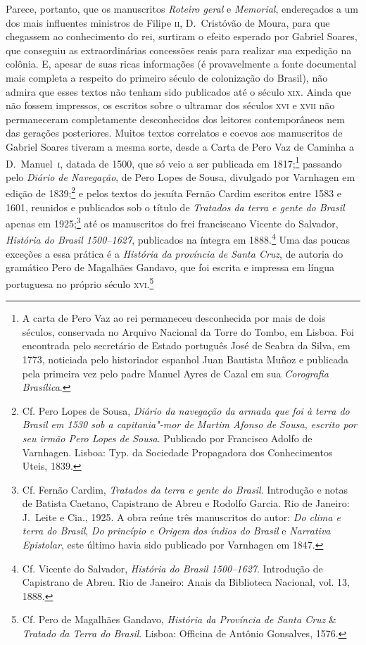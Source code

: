 \documentclass[12pt]{extarticle}
\begin{document}
{Parece, portanto, que os manuscritos \textit{Roteiro geral} e
\textit{Memorial}, endereçados a um dos mais influentes ministros de
Filipe 	\textsc{ii}, D.~Cristóvão de Moura, para que chegassem ao conhecimento do
rei, surtiram o efeito esperado por Gabriel Soares, que conseguiu as
extraordinárias concessões reais para realizar sua expedição na
colônia. E, apesar de suas ricas informações (é provavelmente a fonte
documental mais completa a respeito do primeiro século de colonização
do Brasil), não admira que esses textos não tenham sido publicados até
o século \textsc{xix}. Ainda que não fossem impressos, os escritos sobre o
ultramar dos séculos \textsc{xvi} e \textsc{xvii} não permaneceram completamente
desconhecidos dos leitores contemporâneos nem das gerações posteriores.
Muitos textos correlatos e coevos aos manuscritos de Gabriel Soares
tiveram a mesma sorte, desde a Carta de Pero Vaz de Caminha a D.~Manuel~\textsc{i}, 
datada de 1500, que só veio a ser publicada em 1817;\footnote{ A
carta de Pero Vaz ao rei permaneceu desconhecida por mais de dois
séculos, conservada no Arquivo Nacional da Torre do Tombo, em Lisboa.
Foi encontrada pelo secretário de Estado português José de Seabra da
Silva, em 1773, noticiada pelo historiador espanhol Juan Bautista Muñoz
e publicada pela primeira vez pelo padre Manuel Ayres de Cazal em sua
\textit{Corografia Brasílica}.} passando pelo
\textit{Diário de Navegação}, de Pero Lopes de Sousa, divulgado por
Varnhagen em edição de 1839;\footnote{ Cf. Pero Lopes de Sousa, \textit{Diário da navegação da armada que 
foi à terra do Brasil em 1530 sob a capitania"-mor de Martim Afonso de Sousa,
escrito por seu irmão Pero Lopes de Sousa}. Publicado por Francisco Adolfo de Varnhagen. 
Lisboa: Typ. da Sociedade Propagadora dos Conhecimentos Uteis, 1839.} e pelos textos do jesuíta Fernão Cardim
escritos entre 1583 e 1601, reunidos e publicados 
sob o título de \textit{Tratados da terra e gente do Brasil} apenas em
1925;\footnote{ Cf. Fernão Cardim, \textit{Tratados da terra e gente do Brasil}. 
Introdução e notas de Batista Caetano, Capistrano de Abreu e Rodolfo Garcia. 
Rio de Janeiro: J.~Leite e Cia., 1925. 
A obra reúne três manuscritos do autor: \textit{Do clima e terra do Brasil}, \textit{Do princípio e Origem dos índios do Brasil}
e \textit{Narrativa Epistolar}, este último havia sido publicado por Varnhagen em 1847.} até os manuscritos do frei franciscano Vicente do Salvador,
\textit{História do Brasil 1500--1627}, publicados na íntegra em 1888.\footnote{ Cf. Vicente do Salvador, \textit{História do Brasil 1500--1627}.
Introdução de Capistrano de Abreu. Rio de Janeiro: Anais da Biblioteca Nacional, vol. 13, 1888.}
Uma das poucas exceções a essa prática é a \textit{História da
província de Santa Cruz}, de autoria do gramático Pero de
Magalhães Gandavo, que foi escrita e impressa em língua portuguesa no
próprio século \textsc{xvi}.\footnote{ Cf. Pero de Magalhães Gandavo,
\textit{História da Província de Santa Cruz} \& \textit{Tratado da
Terra do Brasil}. Lisboa: Officina de Antônio Gonsalves, 1576.}

}
\end{document}
